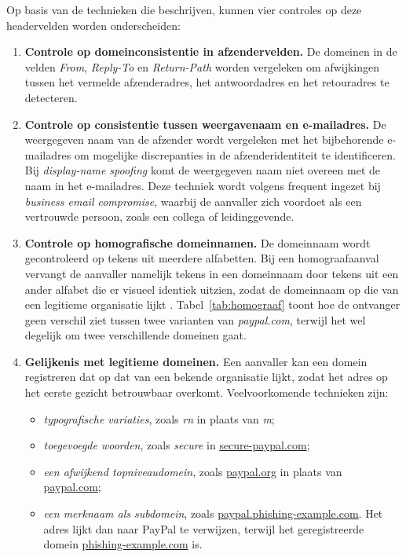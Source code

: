 Op basis van de technieken die \textcite{Veit2025} beschrijven, kunnen vier controles op deze headervelden worden onderscheiden:
\begin{enumerate}
    \item \textbf{Controle op domeinconsistentie in afzendervelden.} De domeinen in de velden \emph{From}, \emph{Reply-To} en \emph{Return-Path} worden vergeleken om afwijkingen tussen het vermelde afzenderadres, het antwoordadres en het retouradres te detecteren.
    \item \textbf{Controle op consistentie tussen weergavenaam en e-mailadres.} De weergegeven naam van de afzender wordt vergeleken met het bijbehorende e-mailadres om mogelijke discrepanties in de afzenderidentiteit te identificeren. Bij \emph{display-name spoofing} komt de weergegeven naam niet overeen met de naam in het e-mailadres. Deze techniek wordt volgens \textcite{Cidon2019} frequent ingezet bij \emph{business email compromise}, waarbij de aanvaller zich voordoet als een vertrouwde persoon, zoals een collega of leidinggevende.
    \item \textbf{Controle op homografische domeinnamen.} De domeinnaam wordt gecontroleerd op tekens uit meerdere alfabetten. Bij een homograafaanval vervangt de aanvaller namelijk tekens in een domeinnaam door tekens uit een ander alfabet die er visueel identiek uitzien, zodat de domeinnaam op die van een legitieme organisatie lijkt \autocite{Sawabe2019}. Tabel~\ref{tab:homograaf} toont hoe de ontvanger geen verschil ziet tussen twee varianten van \emph{paypal.com}, terwijl het wel degelijk om twee verschillende domeinen gaat.
    \item \textbf{Gelijkenis met legitieme domeinen.} Een aanvaller kan een domein registreren dat op dat van een bekende organisatie lijkt, zodat het adres op het eerste gezicht betrouwbaar overkomt. Veelvoorkomende technieken zijn:
        \begin{itemize}
        \item \emph{typografische variaties}, zoals \emph{rn} in plaats van \emph{m};
        \item \emph{toegevoegde woorden}, zoals \emph{secure} in \url{secure-paypal.com};
        \item \emph{een afwijkend topniveaudomein}, zoals \url{paypal.org} in plaats van \url{paypal.com};
        \item \emph{een merknaam als subdomein}, zoals \url{paypal.phishing-example.com}. Het adres lijkt dan naar PayPal te verwijzen, terwijl het geregistreerde domein \url{phishing-example.com} is.
        \end{itemize}
\end{enumerate}

